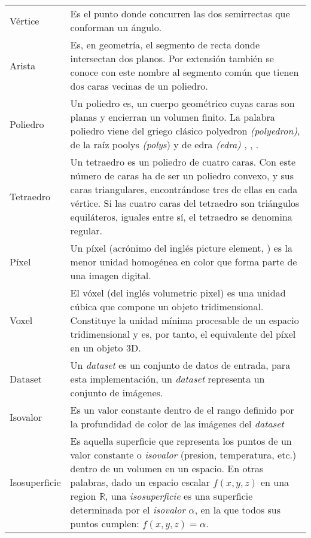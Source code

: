 \begin{table}[h!t]
	\begin{tabular}{lp{11cm}}
	Vértice   & Es el punto donde concurren las dos semirrectas que conforman un ángulo.\\

	Arista    & Es, en geometría, el segmento de recta donde intersectan dos planos. Por extensión también se conoce con este
			nombre al segmento común que tienen dos caras vecinas de un poliedro.\\

	Poliedro  & Un poliedro es, un cuerpo geométrico cuyas caras son planas y encierran un volumen finito. La palabra poliedro
			viene del griego clásico \textgreek{polyedron} \emph{(polyedron)}, de la raíz \textgreek{poolys} \emph{(polys})
			\jcq{muchas} y de \textgreek{edra} \emph{(edra)} \jcq{base}, \jcq{asiento}, \jcq{cara}.\\

	Tetraedro & Un tetraedro es un poliedro de cuatro caras. Con este número de caras ha de ser un
			poliedro convexo, y sus caras triangulares, encontrándose tres de ellas en cada vértice. Si las
			cuatro caras del tetraedro son triángulos equiláteros, iguales entre sí, el tetraedro se denomina
			regular.\\

	Píxel     & Un píxel (acrónimo del inglés picture element, \jcq{elemento de imagen}) es la menor unidad homogénea en color
			que forma parte de una imagen digital.\\

	Voxel     & El vóxel (del inglés volumetric pixel) es una unidad cúbica que compone un objeto
			tridimensional. Constituye la unidad mínima procesable de un espacio tridimensional y es, por
			tanto, el equivalente del píxel en un objeto 3D.\\

	Dataset   & Un \emph{dataset} es un conjunto de datos de entrada, para esta
			implementación, un \emph{dataset} representa un conjunto de imágenes.\\

	Isovalor	& Es un valor constante dentro de el rango definido por la profundidad de 					color de las imágenes del \emph{dataset}\\

	Isosuperficie	& Es aquella superficie que representa los puntos de un valor constante o \emph{isovalor} (presion, temperatura, etc.) dentro de un volumen en un espacio. En otras palabras, dado un espacio escalar $f(x,y,z)$ en una region $\mathbb{R}$, una \emph{isosuperficie} es una superficie determinada por el \emph{isovalor} $\alpha$, en la que todos sus puntos cumplen: $f(x,y,z) = \alpha$.\\

	\end{tabular}
\end{table}

